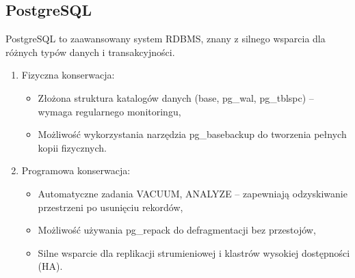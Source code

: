 \documentclass[a4paper,11pt,polish]{sphinxmanual}
\begin{document}
\subsection{PostgreSQL}
\label{\detokenize{Kontrola_i_konserwacja/kontrola_i_konserwacja:postgresql}}
\sphinxAtStartPar
PostgreSQL to zaawansowany system RDBMS, znany z silnego wsparcia dla różnych typów danych i transakcyjności.
\begin{enumerate}
%
\item {} 
\sphinxAtStartPar
Fizyczna konserwacja:
\begin{itemize}
\item {} 
\sphinxAtStartPar
Złożona struktura katalogów danych (base, pg\_wal, pg\_tblspc) – wymaga regularnego monitoringu,

\item {} 
\sphinxAtStartPar
Możliwość wykorzystania narzędzia pg\_basebackup do tworzenia pełnych kopii fizycznych.

\end{itemize}

\item {} 
\sphinxAtStartPar
Programowa konserwacja:
\begin{itemize}
\item {} 
\sphinxAtStartPar
Automatyczne zadania VACUUM, ANALYZE – zapewniają odzyskiwanie przestrzeni po usunięciu rekordów,

\item {} 
\sphinxAtStartPar
Możliwość używania pg\_repack do defragmentacji bez przestojów,

\item {} 
\sphinxAtStartPar
Silne wsparcie dla replikacji strumieniowej i klastrów wysokiej dostępności (HA).

\end{itemize}

\end{enumerate}
\end{document}

